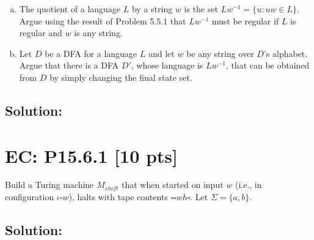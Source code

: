 \documentclass[12pt]{article}
\begin{document}
\begin{enumerate}[(a)]
    \item The quotient of a language $L$ by a string $w$ is the set $Lw^{-1} = \{u : uw \in L\}$. Argue using the result of Problem 5.5.1 that $Lw^{-1}$ must be regular if $L$ is regular and $w$ is any string.

    \item Let $D$ be a DFA for a language $L$ and let $w$ be any string over $D$’s alphabet. Argue that there is a DFA $D'$, whose language is $Lw^{-1}$, that can be obtained from $D$ by simply changing the final state set.
\end{enumerate}

\subsection*{\textbf{Solution:}}


\newpage
\section*{\textbf{EC: P15.6.1} [10 pts]}
Build a Turing machine $M_{shift}$ that when started on input $w$ (i.e., in configuration $\iota \square w$), halts with tape contents $\square \square wh \square$. Let $\Sigma = \{a, b\}$.

\subsection*{\textbf{Solution:}}
\end{document}
